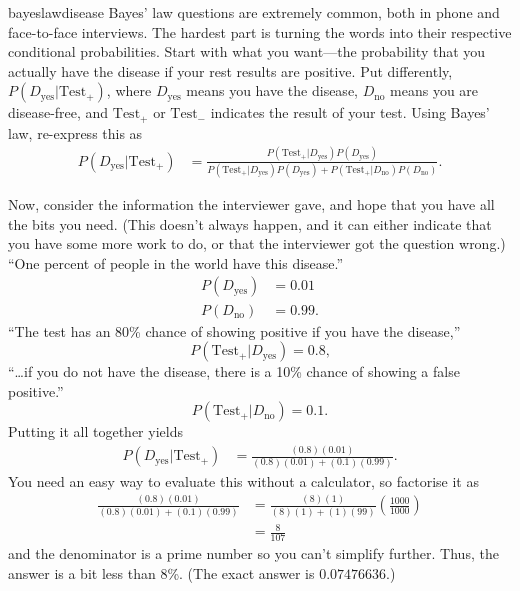 \begin{answer}{bayeslawdisease}
Bayes' law questions are extremely common, both in phone and face-to-face interviews.
The hardest part is turning the words into their respective conditional probabilities.
Start with what you want---the probability that you actually have the disease if your rest results are positive.
Put differently, $P(D_\text{yes}|\text{Test}_+)$, where
$D_\text{yes}$ means you have the disease,
$D_\text{no}$ means you are disease-free,
and
$\text{Test}_+$ or
$\text{Test}_-$ indicates the result of your test.
Using Bayes' law, re-express this as
\begin{align*}
P(D_\text{yes}|\text{Test}_+)
&=
\frac{
  P(
    \text{Test}_+
  |
    D_\text{yes}
  )
  P(
    D_\text{yes}
   )
}
{
  P(
    \text{Test}_+
  |
    D_\text{yes}
  )
  P(
    D_\text{yes}
   )
   +
  P(
    \text{Test}_+
  |
    D_\text{no}
  )
  P(
    D_\text{no}
   )
}
\text{.}
\end{align*}

Now, consider the information the interviewer gave, and hope that you have all the bits you need. (This doesn't always happen, and it can either indicate that you have some more work to do, or that the interviewer got the question wrong.)
``One percent of people in the world have this disease.''
\begin{align*}
  P( D_\text{yes} ) & = 0.01 \\
  P( D_\text{no} ) & = 0.99
  \text{.}
\end{align*}
``The test has an 80\% chance of showing positive if you have the disease,''
\[
  P( \text{Test}_+ | D_\text{yes} ) = 0.8
  \text{,}
\]
``\ldots if you do not have the disease,
there is a 10\% chance of showing a false positive.''
\[
  P( \text{Test}_+ | D_\text{no} ) = 0.1
  \text{.}
\]
Putting it all together yields
\begin{align*}
P(D_\text{yes}|\text{Test}_+)
&= \frac{ (0.8)(0.01) }{ (0.8)(0.01) + (0.1)(0.99)  }
\text{.}
\end{align*}
You need an easy way to evaluate this without a calculator, so factorise it as
\begin{align*}
\frac{ (0.8)(0.01) }{ (0.8)(0.01) + (0.1)(0.99)  }
&= \frac{ (8)(1) }{ (8)(1) + (1)(99)  } \left( \frac{1000}{1000}  \right) \\
&= \frac{8}{107}
\end{align*}
and the denominator is a prime number so you can't simplify further.
Thus, the answer is a bit less than 8\%.
(The exact answer is $0.07476636$.)


\end{answer}
